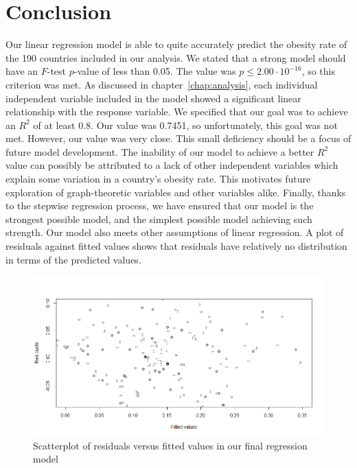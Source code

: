 \documentclass[oneside,12pt]{report}
\begin{document}
\chapter{Conclusion}

Our linear regression model is able to quite accurately predict the obesity rate of the 190 countries included in our analysis. We stated that a strong model should have an $F$-test $p$-value of less than 0.05. The value was \begin{math}p\leq2.00\cdot10^{-16}\end{math}, so this criterion was met. As discussed in chapter~\ref{chap:analysis}, each individual independent variable included in the model showed a significant linear relationship with the response variable. We specified that our goal was to achieve an \begin{math}R^2\end{math} of at least 0.8. Our value was 0.7451, so unfortunately, this goal was not met. However, our value was very close. This small deficiency should be a focus of future model development. The inability of our model to achieve a better \begin{math}R^2\end{math} value can possibly be attributed to a lack of other independent variables which explain some variation in a country's obesity rate. This motivates future exploration of graph-theoretic variables and other variables alike. Finally, thanks to the stepwise regression process, we have ensured that our model is the strongest possible model, and the simplest possible model achieving such strength. Our model also meets other assumptions of linear regression. A plot of residuals against fitted values shows that residuals have relatively no distribution in terms of the predicted values.

\begin{figure}
\centering
\label{fig:fitted-residuals}
\includegraphics[width=\textwidth]{fitted-residuals.png}
\caption[Scatterplot of residuals versus fitted values]{Scatterplot of residuals versus fitted values in our final regression model}
\end{figure}
\end{document}
